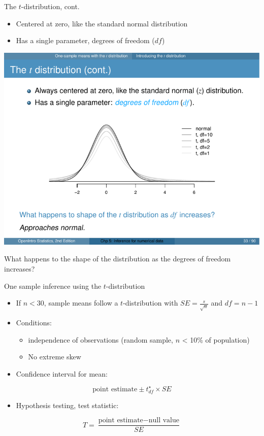 \documentclass[presentation]{beamer}
\begin{document}
\begin{frame}[label={sec:orgb69da39}]{The \(t\)-distribution, cont.}
\begin{itemize}
\item Centered at zero, like the standard normal distribution

\item Has a single parameter, \alert{\alert{degrees of freedom}} (\(df\))
\end{itemize}

\begin{center}
\includegraphics[height=0.40\textheight]{fig-tdistn-df.pdf}
\end{center}

What happens to the shape of the distribution as the degrees of freedom increases?

\end{frame}

\begin{frame}[label={sec:orge122282}]{One sample inference using the \(t\)-distribution}
\begin{itemize}
\item If \(n < 30\), sample means follow a \(t\)-distribution with \(SE = \frac{s}{\sqrt{n}}\) and \(df = n - 1\)
\item Conditions:
\begin{itemize}
\item independence of observations (random sample, \(n\) < 10\% of population)
\item No extreme skew
\end{itemize}
\item Confidence interval for mean:
\end{itemize}
\[
\text{point estimate} \pm t_{df}^{\star} \times SE
\]
\begin{itemize}
\item Hypothesis testing, test statistic:
\end{itemize}
\[
T = \frac{\text{point estimate} - \text{null value}}{SE}
\]

\end{frame}
\end{document}
